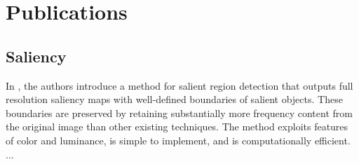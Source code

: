 \section{Publications}
\label{sec:pubs}


\subsection{Saliency}
In \cite{LCAV-CONF-2009-012}, the authors introduce a method for salient region detection that  outputs full resolution saliency maps with well-defined boundaries of salient objects. These boundaries are  preserved by retaining substantially more frequency  content from the original image than other existing  techniques. The method exploits features of color and luminance, is simple to implement, and is computationally  efficient. ...